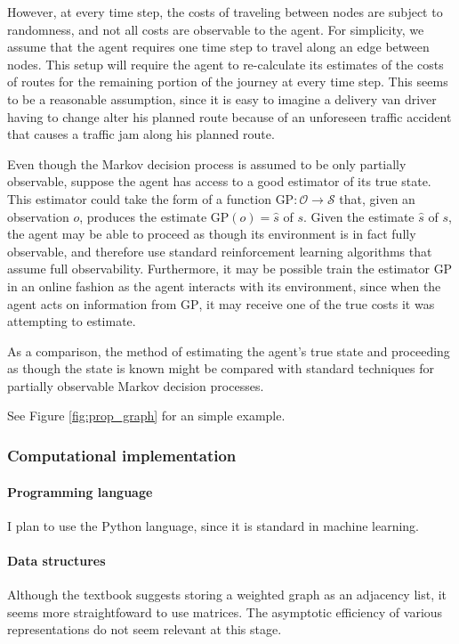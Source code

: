 However, at every time step, the costs of traveling between nodes are subject to randomness, and not all costs are observable to the agent. For simplicity, we assume that the agent requires one time step to travel along an edge between nodes. This setup will require the agent to re-calculate its estimates of the costs of routes for the remaining portion of the journey at every time step. This seems to be a reasonable assumption, since it is easy to imagine a delivery van driver having to change alter his planned route because of an unforeseen traffic accident that causes a traffic jam along his planned route.

Even though the Markov decision process is assumed to be only partially observable, suppose the agent has access to a good estimator of its true state. This estimator could take the form of a function $\text{GP} \colon \mathcal O \to \mathcal S$ that, given an observation $o$, produces the estimate $\text{GP}(o) = \hat s$ of $s$. Given the estimate $\hat s$ of $s$, the agent may be able to proceed as though its environment is in fact fully observable, and therefore use standard reinforcement learning algorithms that assume full observability. Furthermore, it may be possible train the estimator $\text{GP}$ in an online fashion as the agent interacts with its environment, since when the agent acts on information from $\text{GP}$, it may receive one of the true costs it was attempting to estimate.

As a comparison, the method of estimating the agent's true state and proceeding as though the state is known might be compared with standard techniques for partially observable Markov decision processes.

See Figure \ref{fig:prop_graph} for an simple example.

\subsubsection{Computational implementation}

\paragraph{Programming language} I plan to use the Python language, since it is standard in machine learning.

\paragraph{Data structures} Although the textbook \cite[Ch. 20]{clrs} suggests storing a weighted graph as an adjacency list, it seems more straightfoward to use matrices. The asymptotic efficiency of various representations do not seem relevant at this stage.

